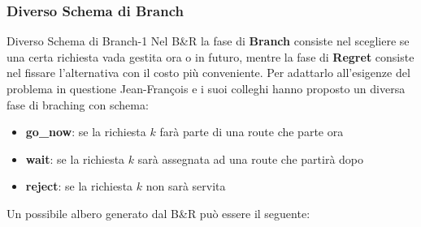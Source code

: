 \documentclass[10pt]{beamer}
\begin{document}
    \subsubsection{Diverso Schema di Branch}\label{sec:b-and-r-branchschema}
    \begin{frame}{Diverso Schema di Branch-1}
        Nel B\&R la fase di \textbf{Branch} consiste nel scegliere se una certa richiesta vada gestita ora o in futuro, mentre la fase di \textbf{Regret} consiste nel fissare l'alternativa con il costo più conveniente. Per adattarlo all'esigenze del problema in questione Jean-François e i suoi colleghi hanno proposto un diversa fase di braching con schema:

        \begin{itemize}
            \item \textbf{go\_now}: se la richiesta {\(k\)} farà parte di una route che parte ora
            \item \textbf{wait}: se la richiesta {\(k\)} sarà assegnata ad una route che partirà dopo
            \item \textbf{reject}: se la richiesta {\(k\)} non sarà servita
        \end{itemize}

        Un possibile albero generato dal B\&R può essere il seguente:
    \end{frame}
\end{document}
